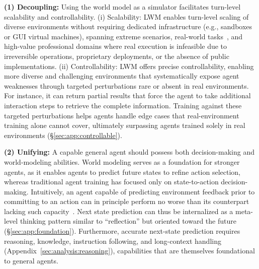 \begin{tcolorbox}[
  enhanced,
  colback=boxwarm!30,
  colframe=boxbrown!80,
  colbacktitle=boxwarm,
  coltitle=boxbrown!90!black,
  fonttitle=\small,
  title={\textbf{Why Language World Models When Real Environments Exist?}\\{Not for Cost Reduction, but as a Complementary Axis for Pushing the Frontier}},
  boxrule=0.5pt,
  arc=1.5pt,
  left=8pt, right=8pt, top=4pt, bottom=4pt,
  toptitle=3pt, bottomtitle=3pt,
]
\textbf{(1) Decoupling:} Using the world model as a simulator facilitates turn-level scalability and controllability.
(i) Scalability:
LWM enables turn-level scaling of diverse environments without requiring dedicated infrastructure (e.g., sandboxes or GUI virtual machines), spanning extreme scenarios, real-world tasks~\citep{openclaw2026,patwardhan2025gdpval}, and high-value professional domains where real execution is infeasible due to irreversible operations, proprietary deployments, or the absence of public implementations.
(ii) Controllability:
LWM offers precise controllability, enabling more diverse and challenging environments that systematically expose agent weaknesses through targeted perturbations rare or absent in real environments.
For instance, it can return partial results that force the agent to take additional interaction steps to retrieve the complete information.
Training against these targeted perturbations helps agents handle edge cases that real-environment training alone cannot cover, ultimately surpassing agents trained solely in real environments (\S\ref{sec:app:controllable}).

\smallskip
\textbf{(2) Unifying:} A capable general agent should possess both decision-making and world-modeling abilities.
World modeling serves as a foundation for stronger agents, as it enables agents to predict future states to refine action selection, whereas traditional agent training has focused only on state-to-action decision-making.
Intuitively, an agent capable of predicting environment feedback prior to committing to an action can in principle perform no worse than its counterpart lacking such capacity~\citep{richens2025general}.
Next state prediction can thus be internalized as a meta-level thinking pattern similar to ``reflection'' but oriented toward the future (\S\ref{sec:app:foundation}).
Furthermore, accurate next-state prediction requires reasoning, knowledge, instruction following, and long-context handling (Appendix~\ref{sec:analysis:reasoning}), capabilities that are themselves foundational to general agents.
\end{tcolorbox}


